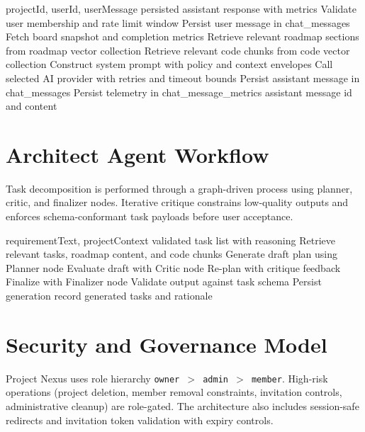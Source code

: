 \documentclass[a4paper, 11pt, oneside]{Dissertation}
\begin{document}
\begin{algorithm}[H]
\caption{Context-Aware Chat Response Generation}
\label{alg:chat-pipeline}
\begin{algorithmic}[1]
\Require projectId, userId, userMessage
\Ensure persisted assistant response with metrics
\State Validate user membership and rate limit window
\State Persist user message in chat\_messages
\State Fetch board snapshot and completion metrics
\State Retrieve relevant roadmap sections from roadmap vector collection
\State Retrieve relevant code chunks from code vector collection
\State Construct system prompt with policy and context envelopes
\State Call selected AI provider with retries and timeout bounds
\State Persist assistant message in chat\_messages
\State Persist telemetry in chat\_message\_metrics
\State \Return assistant message id and content
\end{algorithmic}
\end{algorithm}

\FloatBarrier

\section{Architect Agent Workflow}
Task decomposition is performed through a graph-driven process using planner, critic, and finalizer nodes. Iterative critique constrains low-quality outputs and enforces schema-conformant task payloads before user acceptance.

\begin{algorithm}[H]
\caption{Architect Agent with Critique Loop}
\label{alg:architect-loop}
\begin{algorithmic}[1]
\Require requirementText, projectContext
\Ensure validated task list with reasoning
\State Retrieve relevant tasks, roadmap content, and code chunks
\State Generate draft plan using Planner node
\State Evaluate draft with Critic node
    \State Re-plan with critique feedback
\EndIf
\State Finalize with Finalizer node
\State Validate output against task schema
\State Persist generation record
\State \Return generated tasks and rationale
\end{algorithmic}
\end{algorithm}

\FloatBarrier

\section{Security and Governance Model}
Project Nexus uses role hierarchy \texttt{owner $>$ admin $>$ member}. High-risk operations (project deletion, member removal constraints, invitation controls, administrative cleanup) are role-gated. The architecture also includes session-safe redirects and invitation token validation with expiry controls.
\end{document}
